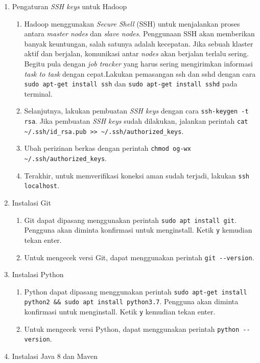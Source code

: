 \begin{enumerate}
\begin{enumerate}
  \end{enumerate}
  \item Pengaturan \textit{SSH keys} untuk Hadoop
  \begin{enumerate}
  	\item Hadoop menggunakan \textit{Secure Shell} (SSH) untuk menjalankan proses antara \textit{master nodes} dan \textit{slave nodes}. Penggunaan SSH akan memberikan banyak keuntungan, salah satunya adalah kecepatan. Jika sebuah klaster aktif dan berjalan, komunikasi antar \textit{nodes} akan berjalan terlalu sering. Begitu pula dengan \textit{job tracker} yang harus sering mengirimkan informasi \textit{task to task} dengan cepat.Lakukan pemasangan ssh dan sshd dengan cara \verb|sudo apt-get install ssh| dan \verb|sudo apt-get install sshd| pada terminal.
    \item Selanjutnya, lakukan pembuatan \textit{SSH keys} dengan cara \verb|ssh-keygen -t rsa|. Jika pembuatan \textit{SSH keys} sudah dilakukan, jalankan perintah \verb|cat ~/.ssh/id_rsa.pub >> ~/.ssh/authorized_keys|.
    \item Ubah perizinan berkas dengan perintah \verb|chmod og-wx ~/.ssh/authorized_keys|.
    \item Terakhir, untuk memverifikasi koneksi aman sudah terjadi, lakukan \verb|ssh localhost|.
  \end{enumerate}
  \item Instalasi Git
  \begin{enumerate}
    \item Git dapat dipasang menggunakan perintah \verb|sudo apt install git|. Pengguna akan diminta konfirmasi untuk menginstall. Ketik \verb|y| kemudian tekan enter.
    \item Untuk mengecek versi Git, dapat menggunakan perintah \verb|git --version|.
  \end{enumerate}
  \item Instalasi Python
  \begin{enumerate}
    \item Python dapat dipasang menggunakan perintah \verb|sudo apt-get install python2 && sudo apt install python3.7|. Pengguna akan diminta konfirmasi untuk menginstall. Ketik \verb|y| kemudian tekan enter.
    \item Untuk mengecek versi Python, dapat menggunakan perintah \verb|python --version|.
  \end{enumerate}
  \item Instalasi Java 8 dan Maven
  \begin{enumerate}

\end{enumerate}
\end{enumerate}
